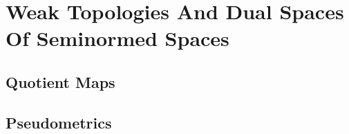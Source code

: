 \section{Weak Topologies And Dual Spaces Of Seminormed Spaces}
\subsection{Quotient Maps}










 



 









\subsection{Pseudometrics}

















